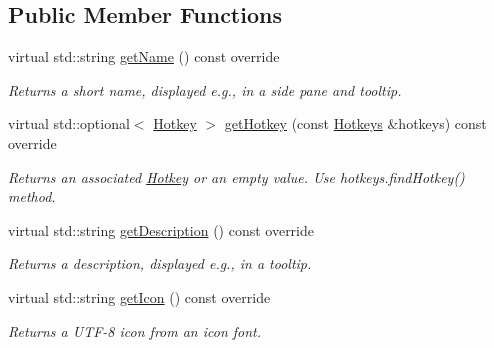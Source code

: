 \subsection*{Public Member Functions}
\begin{DoxyCompactItemize}
\item 
\mbox{\label{classpepr3d_1_1_information_a47a2d35503bb815b00b1af744b756c01}} 
virtual std\+::string \mbox{\hyperlink{classpepr3d_1_1_information_a47a2d35503bb815b00b1af744b756c01}{get\+Name}} () const override
\begin{DoxyCompactList}\small\item\em Returns a short name, displayed e.\+g., in a side pane and tooltip. \end{DoxyCompactList}\item 
\mbox{\label{classpepr3d_1_1_information_a60e2c3f0fd0426bf321b611f2dd6739c}} 
virtual std\+::optional$<$ \mbox{\hyperlink{structpepr3d_1_1_hotkey}{Hotkey}} $>$ \mbox{\hyperlink{classpepr3d_1_1_information_a60e2c3f0fd0426bf321b611f2dd6739c}{get\+Hotkey}} (const \mbox{\hyperlink{classpepr3d_1_1_hotkeys}{Hotkeys}} \&hotkeys) const override
\begin{DoxyCompactList}\small\item\em Returns an associated \mbox{\hyperlink{structpepr3d_1_1_hotkey}{Hotkey}} or an empty value. Use hotkeys.\+find\+Hotkey() method. \end{DoxyCompactList}\item 
\mbox{\label{classpepr3d_1_1_information_a5520aaebfdfc050b9d637fa04f21b79c}} 
virtual std\+::string \mbox{\hyperlink{classpepr3d_1_1_information_a5520aaebfdfc050b9d637fa04f21b79c}{get\+Description}} () const override
\begin{DoxyCompactList}\small\item\em Returns a description, displayed e.\+g., in a tooltip. \end{DoxyCompactList}\item 
\mbox{\label{classpepr3d_1_1_information_ae3de34239571758b64090255ac9cf223}} 
virtual std\+::string \mbox{\hyperlink{classpepr3d_1_1_information_ae3de34239571758b64090255ac9cf223}{get\+Icon}} () const override
\begin{DoxyCompactList}\small\item\em Returns a U\+T\+F-\/8 icon from an icon font. \end{DoxyCompactList}\item 

\end{DoxyCompactItemize}
